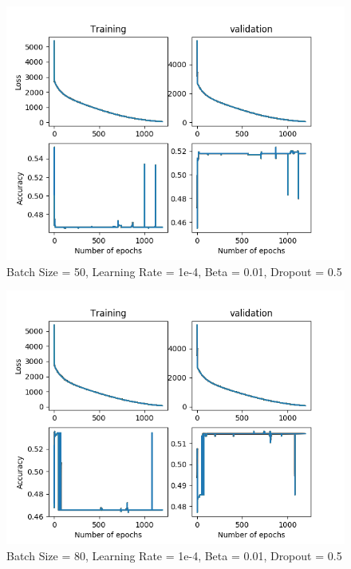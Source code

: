 \documentclass[12pt,reqno]{amsart}
\numberwithin{equation}{section}
\begin{document}
\begin{enumerate}
\begin{figure}[H]
\centering
\includegraphics[scale=0.6]{data12-1e-4-50-1e-2-5e-1}
\caption{Batch Size = 50, Learning Rate = 1e-4, Beta = 0.01, Dropout = 0.5}
\end{figure}

\begin{figure}[H]
\centering
\includegraphics[scale=0.6]{data12-1e-4-80-1e-2-5e-1}
\caption{Batch Size = 80, Learning Rate = 1e-4, Beta = 0.01, Dropout = 0.5}
\end{figure}


\end{enumerate}
\end{document}
